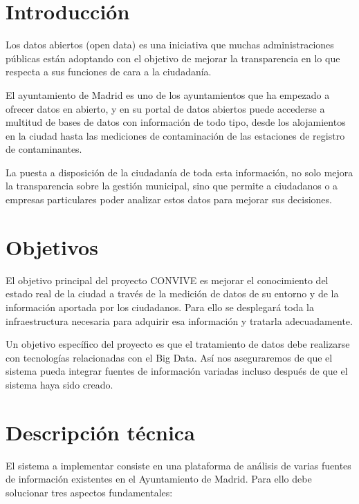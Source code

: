\documentclass[
  a4paper,
]{scrreport}
\begin{document}
\hypertarget{introducciuxf3n}{%
\section{Introducción}\label{introducciuxf3n}}

Los datos abiertos (open data) es una iniciativa que muchas
administraciones públicas están adoptando con el objetivo de mejorar la
transparencia en lo que respecta a sus funciones de cara a la
ciudadanía.

El ayuntamiento de Madrid es uno de los ayuntamientos que ha empezado a
ofrecer datos en abierto, y en su portal de datos abiertos puede
accederse a multitud de bases de datos con información de todo tipo,
desde los alojamientos en la ciudad hasta las mediciones de
contaminación de las estaciones de registro de contaminantes.

La puesta a disposición de la ciudadanía de toda esta información, no
solo mejora la transparencia sobre la gestión municipal, sino que
permite a ciudadanos o a empresas particulares poder analizar estos
datos para mejorar sus decisiones.

\hypertarget{objetivos}{%
\section{Objetivos}\label{objetivos}}

El objetivo principal del proyecto CONVIVE es mejorar el conocimiento
del estado real de la ciudad a través de la medición de datos de su
entorno y de la información aportada por los ciudadanos. Para ello se
desplegará toda la infraestructura necesaria para adquirir esa
información y tratarla adecuadamente.

Un objetivo específico del proyecto es que el tratamiento de datos debe
realizarse con tecnologías relacionadas con el Big Data. Así nos
aseguraremos de que el sistema pueda integrar fuentes de información
variadas incluso después de que el sistema haya sido creado.

\hypertarget{descripciuxf3n-tuxe9cnica}{%
\section{Descripción técnica}\label{descripciuxf3n-tuxe9cnica}}

El sistema a implementar consiste en una plataforma de análisis de
varias fuentes de información existentes en el Ayuntamiento de Madrid.
Para ello debe solucionar tres aspectos fundamentales:
\end{document}
